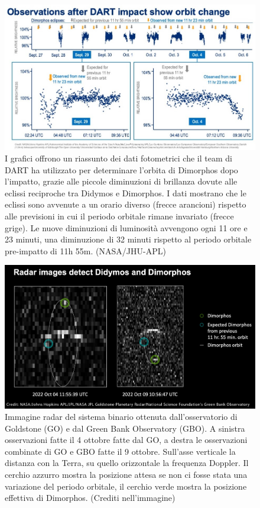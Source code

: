 \documentclass[a4paper,11pt,openright]{book}
\begin{document}
\begin{figure}
    \centering
    \includegraphics[width=\textwidth]{figure/impact_lightcurve.jpg}
    \caption[Riassunto dei dati fotometrici utilizzati per determinare l'orbita post-impatto.]{I grafici offrono un riassunto dei dati fotometrici che il team di DART ha utilizzato per determinare l'orbita di Dimorphos dopo l'impatto, grazie alle piccole diminuzioni di brillanza dovute alle eclissi reciproche tra Didymos e Dimorphos. I dati mostrano che le eclissi sono avvenute a un orario diverso (frecce arancioni) rispetto alle previsioni in cui il periodo orbitale rimane invariato (frecce grige). Le nuove diminuzioni di luminosità avvengono ogni 11 ore e 23 minuti, una diminuzione di 32 minuti rispetto al periodo orbitale pre-impatto di 11h 55m. (NASA/JHU-APL)}
    \label{fig:impact_lightcurve}
\end{figure}

\begin{figure}
    \centering
    \includegraphics[scale=0.25]{figure/expected_dimorphos.png}
    \caption[Immagine radar del sistema post-impatto.]{Immagine radar del sistema binario ottenuta dall'osservatorio di Goldstone (GO) e dal Green Bank Observatory (GBO). A sinistra osservazioni fatte il 4 ottobre fatte dal GO, a destra le osservazioni combinate di GO e GBO fatte il 9 ottobre. Sull'asse verticale la distanza con la Terra, su quello orizzontale la frequenza Doppler. Il cerchio azzurro mostra la posizione attesa se non ci fosse stata una variazione del periodo orbitale, il cerchio verde mostra la posizione effettiva di Dimorphos. (Crediti nell'immagine)}
    \label{fig:expected_dimorphos}
\end{figure}
\end{document}
